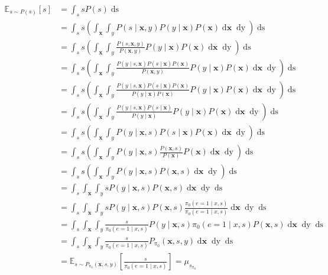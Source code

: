 \documentclass[
	a4paper,
	11pt
	]{article}
\begin{document}
\begin{align*}
    \mathbb{E}_{s \sim P(s)}[s] &= \int_s sP(s) \mathop{ds} \\
    &= \int_s s \left(\int_{\boldsymbol{x}} \int_{y} P(s \mid \boldsymbol{x}, y)P(y \mid \boldsymbol{x})P(\boldsymbol{x}) \mathop{d\boldsymbol{x}} \mathop{dy}\right) \mathop{ds} \\
    &= \int_s s \left(\int_{\boldsymbol{x}} \int_{y} \frac{P(s, \boldsymbol{x}, y)}{P(\boldsymbol{x}, y)}P(y \mid \boldsymbol{x})P(\boldsymbol{x}) \mathop{d\boldsymbol{x}} \mathop{dy}\right) \mathop{ds} \\
    &= \int_s s \left(\int_{\boldsymbol{x}} \int_{y} \frac{P(y \mid s, \boldsymbol{x})P(s \mid \boldsymbol{x})P(\boldsymbol{x})}{P(\boldsymbol{x}, y)}P(y \mid \boldsymbol{x})P(\boldsymbol{x}) \mathop{d\boldsymbol{x}} \mathop{dy}\right) \mathop{ds} \\
    &= \int_s s \left(\int_{\boldsymbol{x}} \int_{y} \frac{P(y \mid s, \boldsymbol{x})P(s \mid \boldsymbol{x})P(\boldsymbol{x})}{P(y \mid \boldsymbol{x})P(\boldsymbol{x})}P(y \mid \boldsymbol{x})P(\boldsymbol{x}) \mathop{d\boldsymbol{x}} \mathop{dy}\right) \mathop{ds} \\
    &= \int_s s \left(\int_{\boldsymbol{x}} \int_{y} \frac{P(y \mid s, \boldsymbol{x})P(s \mid \boldsymbol{x})}{P(y \mid \boldsymbol{x})} P(y \mid \boldsymbol{x})P(\boldsymbol{x}) \mathop{d\boldsymbol{x}} \mathop{dy}\right) \mathop{ds} \\
    &= \int_s s \left(\int_{\boldsymbol{x}} \int_{y} P(y \mid \boldsymbol{x}, s)P(s \mid \boldsymbol{x})P(\boldsymbol{x}) \mathop{d\boldsymbol{x}} \mathop{dy}\right) \mathop{ds} \\
    &= \int_s s \left(\int_{\boldsymbol{x}} \int_{y} P(y \mid \boldsymbol{x}, s)\frac{P(\boldsymbol{x}, s)}{P(\boldsymbol{x})} P(\boldsymbol{x}) \mathop{d\boldsymbol{x}} \mathop{dy}\right) \mathop{ds} \\
    &= \int_s s \left(\int_{\boldsymbol{x}} \int_{y} P(y \mid \boldsymbol{x}, s)P(\boldsymbol{x}, s)\mathop{d\boldsymbol{x}} \mathop{dy}\right) \mathop{ds} \\
    &= \int_s \int_{\boldsymbol{x}} \int_{y} s P(y \mid \boldsymbol{x}, s)P(\boldsymbol{x}, s)\mathop{d\boldsymbol{x}} \mathop{dy} \mathop{ds} \\
    &= \int_s \int_{\boldsymbol{x}} \int_{y} s P(y \mid \boldsymbol{x}, s)P(\boldsymbol{x}, s)\frac{\pi_0(e = 1 \mid x,s)}{\pi_0(e = 1 \mid x,s)}\mathop{d\boldsymbol{x}} \mathop{dy} \mathop{ds} \\
    &= \int_s \int_{\boldsymbol{x}} \int_{y} \frac{s}{\pi_0(e = 1 \mid x,s)} P(y \mid \boldsymbol{x}, s)\pi_0(e = 1 \mid x,s)P(\boldsymbol{x}, s)\mathop{d\boldsymbol{x}} \mathop{dy} \mathop{ds} \\
    &= \int_s \int_{\boldsymbol{x}} \int_{y} \frac{s}{\pi_0(e = 1 \mid x,s)} P_{\pi_0}(\boldsymbol{x}, s, y)\mathop{d\boldsymbol{x}} \mathop{dy} \mathop{ds} \\
    &= \mathbb{E}_{s \sim P_{\pi_{0}}(\boldsymbol{x}, s, y)}\left[\frac{s}{\pi_0(e = 1 \mid x,s)}\right] = \mu_{s_{\pi_0}}
\end{align*}
\end{document}
